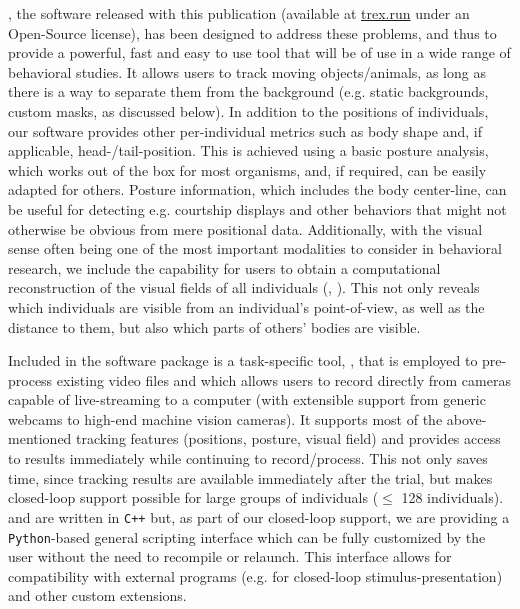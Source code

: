 \documentclass[9pt,lineno]{elife}
\newcommand{\TRex}{\protect\path{TRex}}
\newcommand{\TGrabs}{\protect\path{TGrabs}}
\begin{document}
\TRex{}, the software released with this publication (available at \href{https://trex.run}{trex.run} under an Open-Source license), has been designed to address these problems, and thus to provide a powerful, fast and easy to use tool that will be of use in a wide range of behavioral studies. It allows users to track moving objects/animals, as long as there is a way to separate them from the background (e.g. static backgrounds, custom masks, as discussed below). In addition to the positions of individuals, our software provides other per-individual metrics such as body shape and, if applicable, head-/tail-position. This is achieved using a basic posture analysis, which works out of the box for most organisms, and, if required, can be easily adapted for others. Posture information, which includes the body center-line, can be useful for detecting e.g. courtship displays and other behaviors that might not otherwise be obvious from mere positional data. Additionally, with the visual sense often being one of the most important modalities to consider in behavioral research, we include the capability for users to obtain a computational reconstruction of the visual fields of all individuals (\citealt{strandburg2013visual}, \citealt{rosenthal2015revealing}). This not only reveals which individuals are visible from an individual's point-of-view, as well as the distance to them, but also which parts of others' bodies are visible.

Included in the software package is a task-specific tool, \TGrabs{}, that is employed to pre-process existing video files and which allows users to record directly from cameras capable of live-streaming to a computer (with extensible support from generic webcams to high-end machine vision cameras). It supports most of the above-mentioned tracking features (positions, posture, visual field) and provides access to results immediately while continuing to record/process. This not only saves time, since tracking results are available immediately after the trial, but makes closed-loop support possible for large groups of individuals ($\leq$ 128 individuals). \TRex{} and \TGrabs{} are written in \verb!C++! but, as part of our closed-loop support, we are providing a \verb!Python!-based general scripting interface which can be fully customized by the user without the need to recompile or relaunch. This interface allows for compatibility with external programs (e.g. for closed-loop  stimulus-presentation) and other custom extensions.
\end{document}
